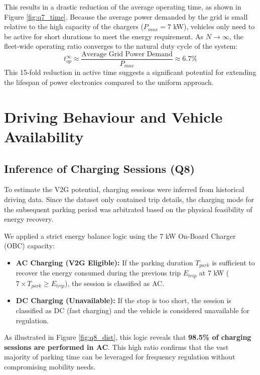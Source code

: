 \documentclass{article}
\begin{document}
This results in a drastic reduction of the average operating time, as shown in Figure \ref{fig:q7_time}. Because the average power demanded by the grid is small relative to the high capacity of the chargers ($P_{max} = 7$ kW), vehicles only need to be active for short durations to meet the energy requirement. As $N \rightarrow \infty$, the fleet-wide operating ratio converges to the natural duty cycle of the system:
\begin{equation}
    t_{op}^{\infty} \approx \frac{\text{Average Grid Power Demand}}{P_{max}} \approx 6.7\%
\end{equation}
This 15-fold reduction in active time suggests a significant potential for extending the lifespan of power electronics compared to the uniform approach.

\section{Driving Behaviour and Vehicle Availability}

\subsection{Inference of Charging Sessions (Q8)}
To estimate the V2G potential, charging sessions were inferred from historical driving data. Since the dataset only contained trip details, the charging mode for the subsequent parking period was arbitrated based on the physical feasibility of energy recovery.

We applied a strict energy balance logic using the 7 kW On-Board Charger (OBC) capacity:
\begin{itemize}
    \item \textbf{AC Charging (V2G Eligible):} If the parking duration $T_{park}$ is sufficient to recover the energy consumed during the previous trip $E_{trip}$ at 7 kW ($7 \times T_{park} \ge E_{trip}$), the session is classified as AC.
    \item \textbf{DC Charging (Unavailable):} If the stop is too short, the session is classified as DC (fast charging) and the vehicle is considered unavailable for regulation.
\end{itemize}

As illustrated in Figure \ref{fig:q8_dist}, this logic reveals that \textbf{98.5\% of charging sessions are performed in AC}. This high ratio confirms that the vast majority of parking time can be leveraged for frequency regulation without compromising mobility needs.
\end{document}
